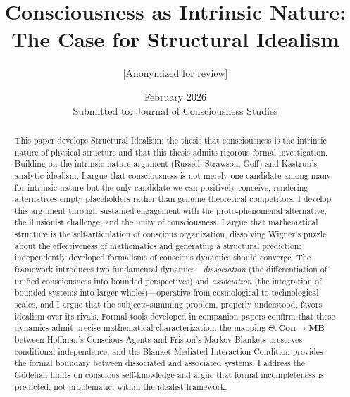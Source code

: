 \documentclass[11pt,a4paper]{article}
\theoremstyle{definition}
\theoremstyle{plain}
\theoremstyle{remark}
\newcommand{\Con}{\mathbf{Con}}
\newcommand{\MB}{\mathbf{MB}}
\begin{document}
\title{\textbf{Consciousness as Intrinsic Nature:\\The Case for Structural Idealism}}

\author{[Anonymized for review]}

\date{February 2026\\[1em]
\small Submitted to: Journal of Consciousness Studies}

\maketitle

\begin{abstract}
This paper develops Structural Idealism: the thesis that consciousness is the intrinsic nature of physical structure and that this thesis admits rigorous formal investigation. Building on the intrinsic nature argument (Russell, Strawson, Goff) and Kastrup's analytic idealism, I argue that consciousness is not merely one candidate among many for intrinsic nature but the only candidate we can positively conceive, rendering alternatives empty placeholders rather than genuine theoretical competitors. I develop this argument through sustained engagement with the proto-phenomenal alternative, the illusionist challenge, and the unity of consciousness. I argue that mathematical structure is the self-articulation of conscious organization, dissolving Wigner's puzzle about the effectiveness of mathematics and generating a structural prediction: independently developed formalisms of conscious dynamics should converge. The framework introduces two fundamental dynamics---\textit{dissociation} (the differentiation of unified consciousness into bounded perspectives) and \textit{association} (the integration of bounded systems into larger wholes)---operative from cosmological to technological scales, and I argue that the subjects-summing problem, properly understood, favors idealism over its rivals. Formal tools developed in companion papers confirm that these dynamics admit precise mathematical characterization: the mapping $\Theta: \Con \to \MB$ between Hoffman's Conscious Agents and Friston's Markov Blankets preserves conditional independence, and the Blanket-Mediated Interaction Condition provides the formal boundary between dissociated and associated systems. I address the G\"odelian limits on conscious self-knowledge and argue that formal incompleteness is predicted, not problematic, within the idealist framework.
\end{abstract}
\end{document}
